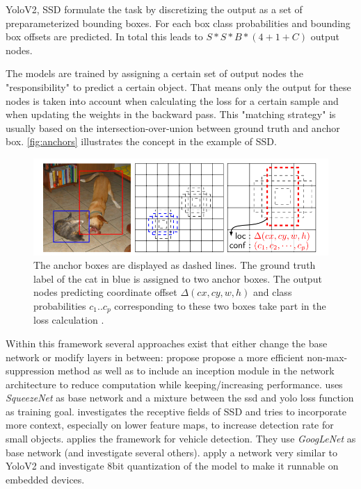 	YoloV2, SSD  formulate the task by discretizing the output as a set of preparameterized bounding boxes. For each box class probabilities and bounding box offsets are predicted. In total this leads to $S*S*B*(4 + 1 + C)$ output nodes. 
	
	The models are trained by assigning a certain set of output nodes the "responsibility" to predict a certain object. That means only the output for these nodes is taken into account when calculating the loss for a certain sample and when updating the weights in the backward pass. This "matching strategy" is usually based on the intersection-over-union between ground truth and anchor box. \autoref{fig:anchors} illustrates the concept in the example of SSD.  
	
	\begin{figure}[hbtp]
		
		\centering
		\captionsetup{justification=raggedright,singlelinecheck=false}
		\includegraphics[width=0.8\linewidth]{fig/anchors}
		\caption{The anchor boxes are displayed as dashed lines. The ground truth label of the cat in blue is assigned to two anchor boxes. The output nodes predicting coordinate offset $\Delta(cx, cy, w,h)$ and class probabilities $c_1 .. c_p$ corresponding to these two boxes take part in the loss calculation \cite{Liu}.}
		\label{fig:anchors}
		
	\end{figure}
	
	Within this framework several approaches exist that either change the base network or modify layers in between: \cite{ChengchengNing2017} propose propose a more efficient non-max-suppression method as well as to include an inception module in the network architecture to reduce computation while keeping/increasing performance. \cite{Wu} uses \textit{SqueezeNet} as base network and a mixture between the ssd and yolo loss function as training goal. \cite{Xiang} investigates the receptive fields of SSD and tries to incorporate more context, especially on lower feature maps, to increase detection rate for small objects.\cite{Linb} applies the framework for vehicle detection. They use \textit{GoogLeNet} as base network (and investigate several others).\cite{TripathiSanDiego} apply a network very similar to YoloV2 and investigate 8bit quantization of the model to make it runnable on embedded devices.
	
